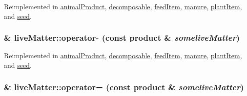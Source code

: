 Reimplemented in \hyperlink{classanimal_product_a80febd49f670e55f887240f7c1f65662}{animalProduct}, \hyperlink{classdecomposable_a3ce2092217848b27b52fc54327c8ad53}{decomposable}, \hyperlink{classfeed_item_ab2bb86c4db1650dac95b927ce96f45c5}{feedItem}, \hyperlink{classmanure_a021351fd3857778590b48842dfd8fd5f}{manure}, \hyperlink{classplant_item_aee9a9da7f6a40551ff0e172561d6a881}{plantItem}, and \hyperlink{classseed_acb2c018454084660561fa623ca2ee6da}{seed}.\hypertarget{classlive_matter_a6b8311a516ba78a7caacc80a28ec143e}{
\subsubsection[{operator-\/}]{ \& liveMatter::operator-\/ (const {\bf product} \& {\em someliveMatter})}}
\label{classlive_matter_a6b8311a516ba78a7caacc80a28ec143e}


Reimplemented in \hyperlink{classanimal_product_ad7c934680a4e21b36ff1fb8626d4621e}{animalProduct}, \hyperlink{classdecomposable_a2af3d9d773f8cdf8d84ce51ed5c470ff}{decomposable}, \hyperlink{classfeed_item_aa3d93bb82d9d41b25214375a88ee36f8}{feedItem}, \hyperlink{classmanure_a78dc3bbc39591aeb4ac6b3b722d66a0d}{manure}, \hyperlink{classplant_item_a3ca74628fd07b229a871ac0f80e31a41}{plantItem}, and \hyperlink{classseed_a950984dedb76a7de041bc2ca20a0ecdd}{seed}.\hypertarget{classlive_matter_a3b1eb79d0f248a4459874db44c335cac}{
\subsubsection[{operator=}]{ \& liveMatter::operator= (const {\bf product} \& {\em someliveMatter})}}
\label{classlive_matter_a3b1eb79d0f248a4459874db44c335cac}


